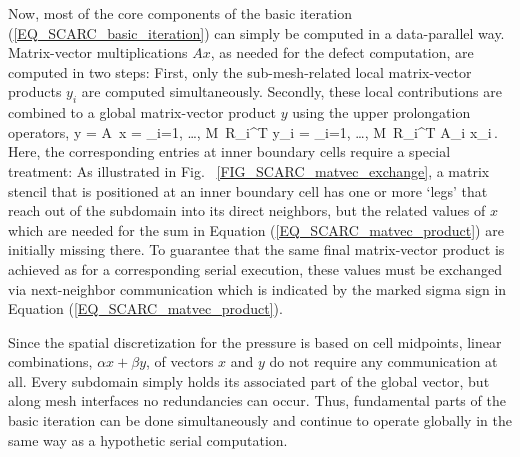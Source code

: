 Now, most of the core components of the basic iteration (\ref{EQ_SCARC_basic_iteration}) can simply be computed in a data-parallel way.
Matrix-vector multiplications $Ax$, as needed for the defect computation, are computed in two steps: First, only the sub-mesh-related local matrix-vector products $y_i$ are computed simultaneously.
Secondly, these local contributions are combined to a global matrix-vector product $y$ using the upper prolongation operators, 
\be 
y = A\, x = {\widetilde{\sum}}_{i=1, \ldots, M}\, R_i^T y_i = {\widetilde{\sum}}_{i=1, \ldots, M}\, R_i^T A_i x_i\,.
\label{EQ_SCARC_matvec_product}
\ee
Here, the corresponding entries at inner boundary cells require a special treatment: As illustrated in Fig.~
\ref{FIG_SCARC_matvec_exchange}, a matrix stencil that is positioned at an inner boundary cell has one or more `legs' that reach out of the subdomain into its direct neighbors, but the related values of $x$ which are needed for the sum in Equation (\ref{EQ_SCARC_matvec_product}) are initially missing there. To guarantee that the same final matrix-vector product is achieved as for a corresponding serial execution, these values must be exchanged via  next-neighbor communication which is indicated by the marked sigma sign in Equation (\ref{EQ_SCARC_matvec_product}).

\begin{figure}[ht]
\end{figure}

Since the spatial discretization for the pressure is based on cell midpoints, linear combinations, $\alpha x+ \beta y$, of vectors $x$ and $y$ do not require any communication at all. Every subdomain simply holds its associated part of the global vector, but along mesh interfaces no redundancies can occur. Thus, fundamental parts of the basic iteration can be done simultaneously and continue to operate globally in the same way as a hypothetic serial computation.


